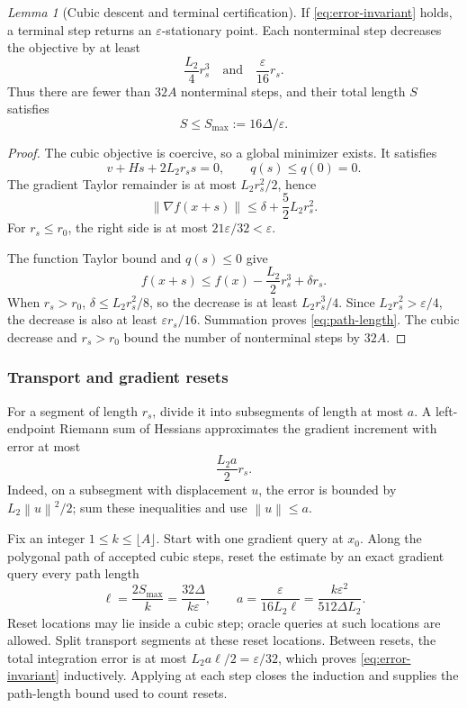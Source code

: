 \documentclass[11pt]{article}
\newtheorem{lemma}[theorem]{Lemma}
\theoremstyle{remark}
\newtheorem{lemma}[lemma]{Lemma}
\theoremstyle{remark}
\newcommand{\eps}{\varepsilon}
\newcommand{\norm}[1]{\left\lVert#1\right\rVert}
\begin{document}
\begin{lemma}[Cubic descent and terminal certification]\label{lem:cubic}
If \eqref{eq:error-invariant} holds, a terminal step returns an $\eps$-stationary point. Each nonterminal step decreases the objective by at least
\[
 \frac{L_2}{4}r_s^3\quad\text{and}\quad\frac{\eps}{16}r_s.
\]
Thus there are fewer than $32A$ nonterminal steps, and their total length $S$ satisfies
\begin{equation}\label{eq:path-length}
 S\le S_{\max}:=16\Delta/\eps.
\end{equation}
\end{lemma}
\begin{proof}
The cubic objective is coercive, so a global minimizer exists. It satisfies
\[
 v+Hs+2L_2r_s s=0,\qquad q(s)\le q(0)=0.
\]
The gradient Taylor remainder is at most $L_2r_s^2/2$, hence
\[
 \norm{\nabla f(x+s)}\le\delta+\frac52L_2r_s^2.
\]
For $r_s\le r_0$, the right side is at most $21\eps/32<\eps$.

The function Taylor bound and $q(s)\le0$ give
\[
 f(x+s)\le f(x)-\frac{L_2}{2}r_s^3+\delta r_s.
\]
When $r_s>r_0$, $\delta\le L_2r_s^2/8$, so the decrease is at least $L_2r_s^3/4$. Since $L_2r_s^2>\eps/4$, the decrease is also at least $\eps r_s/16$. Summation proves \eqref{eq:path-length}. The cubic decrease and $r_s>r_0$ bound the number of nonterminal steps by $32A$.
\end{proof}

\subsubsection{Transport and gradient resets}
For a segment of length $r_s$, divide it into subsegments of length at most $a$. A left-endpoint Riemann sum of Hessians approximates the gradient increment with error at most
\begin{equation}\label{eq:quad-error}
 \frac{L_2a}{2}r_s.
\end{equation}
Indeed, on a subsegment with displacement $u$, the error is bounded by $L_2\norm{u}^2/2$; sum these inequalities and use $\norm{u}\le a$.

Fix an integer $1\le k\le\lfloor A\rfloor$. Start with one gradient query at $x_0$. Along the polygonal path of accepted cubic steps, reset the estimate by an exact gradient query every path length
\begin{equation}\label{eq:transport-parameters}
 \ell=\frac{2S_{\max}}{k}=\frac{32\Delta}{k\eps},\qquad
 a=\frac{\eps}{16L_2\ell}=\frac{k\eps^2}{512\Delta L_2}.
\end{equation}
Reset locations may lie inside a cubic step; oracle queries at such locations are allowed. Split transport segments at these reset locations. Between resets, the total integration error is at most $L_2a\ell/2=\eps/32$, which proves \eqref{eq:error-invariant} inductively. Applying  at each step closes the induction and supplies the path-length bound used to count resets.
\end{document}
